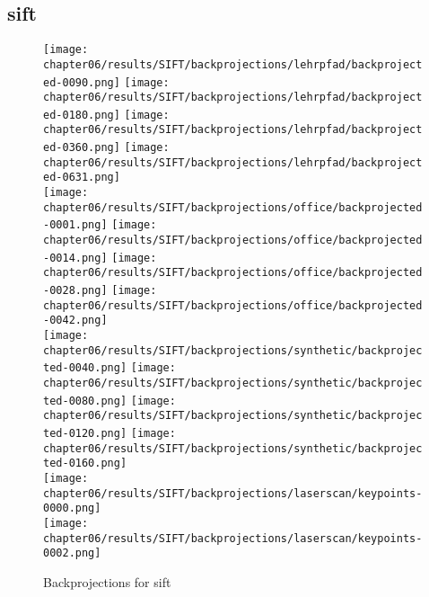 \subsection{\acrshort{sift}}\label{sec:lehrpfad_conversions}
\begin{figure}[H]
    \texttt{[image: chapter06/results/SIFT/backprojections/lehrpfad/backprojected-0090.png]}%
    \texttt{[image: chapter06/results/SIFT/backprojections/lehrpfad/backprojected-0180.png]}%
    \texttt{[image: chapter06/results/SIFT/backprojections/lehrpfad/backprojected-0360.png]}%
    \texttt{[image: chapter06/results/SIFT/backprojections/lehrpfad/backprojected-0631.png]}\\
    \texttt{[image: chapter06/results/SIFT/backprojections/office/backprojected-0001.png]}%
    \texttt{[image: chapter06/results/SIFT/backprojections/office/backprojected-0014.png]}%
    \texttt{[image: chapter06/results/SIFT/backprojections/office/backprojected-0028.png]}%
    \texttt{[image: chapter06/results/SIFT/backprojections/office/backprojected-0042.png]}\\
    \texttt{[image: chapter06/results/SIFT/backprojections/synthetic/backprojected-0040.png]}%
    \texttt{[image: chapter06/results/SIFT/backprojections/synthetic/backprojected-0080.png]}%
    \texttt{[image: chapter06/results/SIFT/backprojections/synthetic/backprojected-0120.png]}%
    \texttt{[image: chapter06/results/SIFT/backprojections/synthetic/backprojected-0160.png]}\\
    \texttt{[image: chapter06/results/SIFT/backprojections/laserscan/keypoints-0000.png]}\\
    \texttt{[image: chapter06/results/SIFT/backprojections/laserscan/keypoints-0002.png]}\\
    \caption{Backprojections for \acrshort{sift}}
\end{figure}
